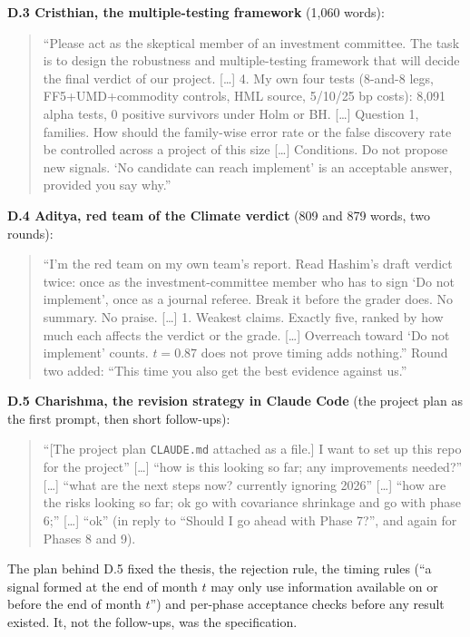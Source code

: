 \documentclass[11pt]{article}
\newenvironment{promptbox}{\begin{quote}\small\sloppy\setlength{\parskip}{0.3em}}{\end{quote}}
\begin{document}
\textbf{D.3 Cristhian, the multiple-testing framework} (1,060 words):
\begin{promptbox}
``Please act as the skeptical member of an investment committee. The task is to design the robustness and multiple-testing framework that will decide the final verdict of our project. [\ldots] 4. My own four tests (8-and-8 legs, FF5+UMD+commodity controls, HML source, 5/10/25 bp costs): 8,091 alpha tests, 0 positive survivors under Holm or BH. [\ldots] Question 1, families. How should the family-wise error rate or the false discovery rate be controlled across a project of this size [\ldots] Conditions. Do not propose new signals. `No candidate can reach implement' is an acceptable answer, provided you say why.''
\end{promptbox}

\textbf{D.4 Aditya, red team of the Climate verdict} (809 and 879 words, two rounds):
\begin{promptbox}
``I'm the red team on my own team's report. Read Hashim's draft verdict twice: once as the investment-committee member who has to sign `Do not implement', once as a journal referee. Break it before the grader does. No summary. No praise. [\ldots] 1. Weakest claims. Exactly five, ranked by how much each affects the verdict or the grade. [\ldots] Overreach toward `Do not implement' counts. $t=0.87$ does not prove timing adds nothing.'' Round two added: ``This time you also get the best evidence against us.''
\end{promptbox}

\textbf{D.5 Charishma, the revision strategy in Claude Code} (the project plan as the first prompt, then short follow-ups):
\begin{promptbox}
``[The project plan \texttt{CLAUDE.md} attached as a file.] I want to set up this repo for the project'' [\ldots] ``how is this looking so far; any improvements needed?'' [\ldots] ``what are the next steps now? currently ignoring 2026'' [\ldots] ``how are the risks looking so far; ok go with covariance shrinkage and go with phase 6;'' [\ldots] ``ok'' (in reply to ``Should I go ahead with Phase 7?'', and again for Phases 8 and 9).
\end{promptbox}

The plan behind D.5 fixed the thesis, the rejection rule, the timing rules (``a signal formed at the end of month $t$ may only use information available on or before the end of month $t$'') and per-phase acceptance checks before any result existed. It, not the follow-ups, was the specification.
\end{document}
